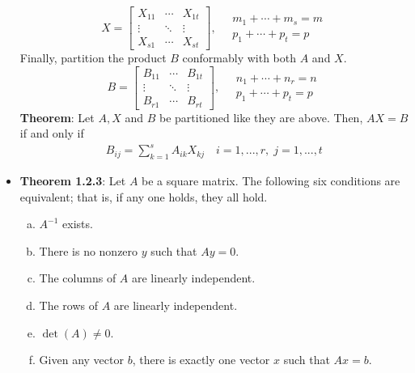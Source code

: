 \documentclass{report}
\begin{document}
\begin{itemize}
            \[
                X =
                \begin{bmatrix}
                    X_{11} & \cdots & X_{1t} \\
                    \vdots & \ddots & \vdots \\
                    X_{s1} & \cdots & X_{st}
                \end{bmatrix}, \quad
                \begin{array}{l}
                    m_1 + \cdots + m_s = m \\
                    p_1 + \cdots + p_t = p
                \end{array}
            \]
            Finally, partition the product $B$ conformably with both $A$ and $X$.
            \[
                B =
                \begin{bmatrix}
                    B_{11} & \cdots & B_{1t} \\
                    \vdots & \ddots & \vdots \\
                    B_{r1} & \cdots & B_{rt}
                \end{bmatrix}, \quad
                \begin{array}{l}
                    n_1 + \cdots + n_r = n \\
                    p_1 + \cdots + p_t = p
                \end{array}
            \]
            \bigbreak \noindent 
            \textbf{Theorem}: Let $A,X$ and $B$ be partitioned like they are above. Then, $AX = B$ if and only if 
            \begin{align*}
                B_{ij} = \sum_{k=1}^{s}A_{ik}X_{kj} \quad i=1,...,r,\; j=1,...,t
            \end{align*}
        \item \textbf{Theorem 1.2.3}: Let $A$ be a square matrix. The following six conditions are equivalent; 
            that is, if any one holds, they all hold.
            \begin{enumerate}[(a)]
                \item $A^{-1}$ exists.
                \item There is no nonzero $y$ such that $Ay = 0$.
                \item The columns of $A$ are linearly independent.
                \item The rows of $A$ are linearly independent.
                \item $\det(A) \neq 0$.
                \item Given any vector $b$, there is exactly one vector $x$ such that $Ax = b$.

\end{enumerate}
\end{itemize}
\end{document}
